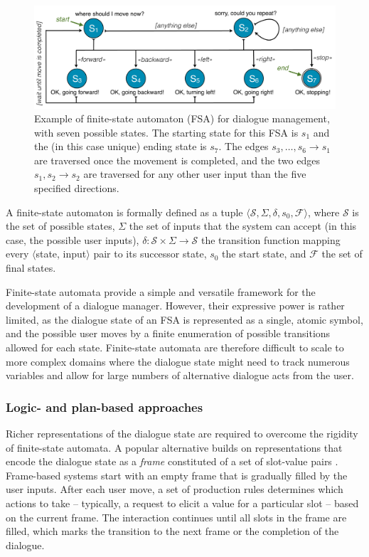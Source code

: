 \begin{figure}[ht]
\centering
\includegraphics[scale=0.35]{imgs/fsa.pdf}
\caption{Example of finite-state automaton (FSA) for dialogue management, with seven possible states. The starting state for this FSA is $s_1$ and the (in this case unique) ending state is $s_7$. The edges $s_3,\dots, s_6 \rightarrow s_1$ are traversed once the movement is completed, and the two edges $s_1, s_2 \rightarrow s_2$ are traversed for any other user input than the five specified directions.}
\label{fig:fsa}
\end{figure}

A finite-state automaton is formally defined as a tuple $\langle \mathcal{S}, \Sigma, \delta, s_0, \mathcal{F} \rangle$, where $\mathcal{S}$ is the set of possible states, $\Sigma$ the set of inputs that the system can accept (in this case, the possible user inputs),  $\delta: \mathcal{S} \times \Sigma \rightarrow \mathcal{S}$ the transition function mapping every $\langle$state, input$\rangle$ pair to its successor state, $s_0$ the start state, and $\mathcal{F}$ the set of final states. 

Finite-state automata provide a simple and versatile framework for the development of a dialogue manager. However, their expressive power is rather limited, as the dialogue state of an FSA is represented as a single, atomic symbol, and the possible user moves by a finite enumeration of possible transitions allowed for each state.  Finite-state automata are therefore difficult to scale to more complex domains where the dialogue state might need to track numerous variables and allow for large numbers of alternative dialogue acts from the user.  

\subsubsection*{Logic- and plan-based approaches}

Richer representations of the dialogue state are required to overcome the rigidity of finite-state automata. A popular alternative builds on representations that encode the dialogue state as a \textit{frame} constituted of a set of slot-value pairs \citep{seneff2000}.  Frame-based systems start with an empty frame that is gradually filled by the user inputs.  After each user move, a set of production rules determines which actions to take  -- typically, a request to elicit a value for a particular slot -- based on the current frame.  The interaction continues until all slots in the frame are filled, which marks the transition to the next frame or the completion of the dialogue. 

